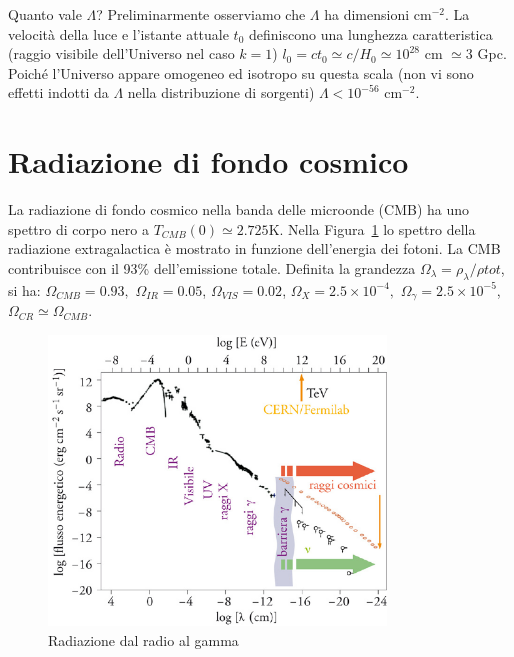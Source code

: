 Quanto vale $\Lambda$?  Preliminarmente osserviamo che $\Lambda$ ha dimensioni
cm$^{-2}$.  La velocità della luce e l'istante attuale $t_0$ definiscono una
lunghezza caratteristica (raggio visibile dell'Universo nel caso $k=1$) $l_0 = c
t_0 \simeq c/H_0 \simeq 10^{28}$ cm $\simeq$3 Gpc.  Poiché l'Universo appare
omogeneo ed isotropo su questa scala (non vi sono effetti indotti da $\Lambda$
nella distribuzione di sorgenti) $\Lambda < 10^{-56}$ cm$^{-2}$.

\section{Radiazione di fondo cosmico}

La radiazione di fondo cosmico nella banda delle microonde (CMB) ha uno spettro
di corpo nero a $T_{CMB}(0) \simeq 2.725$K.  Nella Figura~\ref{fig:radio-gamma}
lo spettro della radiazione extragalactica è mostrato in funzione dell'energia
dei fotoni.  La CMB contribuisce con il 93\% dell'emissione totale.  Definita la
grandezza $\Omega_{\lambda}= \rho_{\lambda}/\rho{tot}$, si ha:
$\Omega_{CMB}=0.93,$ $\Omega_{IR}= 0.05$, $\Omega_{VIS}=0.02$, $\Omega_{X}=2.5
\times 10^{-4},$ $\Omega_{\gamma}= 2.5 \times 10^{-5}$, $\Omega_{CR} \simeq
\Omega_{CMB}$.
\begin{figure}
  \centering{}
  \includegraphics[width=0.8\textwidth]{figure/Radiazione_radio_gamma.pdf}
  \caption{Radiazione dal radio al gamma}
  \label{fig:radio-gamma}
\end{figure}

